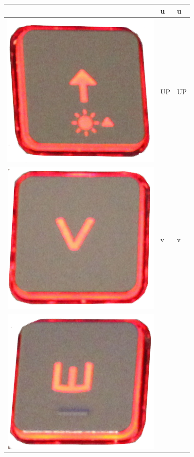 \begin{longtable}{|cll|}
\begin{minipage}[c]{.4\textwidth}
\vspace{0.2cm}
\end{minipage} & u & u\\
\hline
\begin{minipage}[c]{.4\textwidth}
\vspace{0.2cm}
\includegraphics[scale=0.08]{Images/KeyMapping/UP}
\vspace{0.2cm}
\end{minipage} & UP & UP\\
\hline
\begin{minipage}[c]{.4\textwidth}
\vspace{0.2cm}
\includegraphics[scale=0.08]{Images/KeyMapping/v}
\vspace{0.2cm}
\end{minipage} & v & v\\
\hline
\begin{minipage}[c]{.4\textwidth}
\vspace{0.2cm}
\includegraphics[scale=0.08]{Images/KeyMapping/w}

\end{minipage}
\end{longtable}
